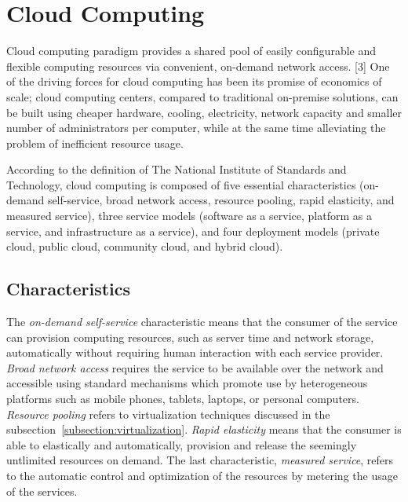 \section{Cloud Computing}

Cloud computing paradigm provides a shared pool of easily configurable and flexible computing resources via convenient, on-demand network access. [3] One of the driving forces for cloud computing has been its promise of economics of scale; cloud computing centers, compared to traditional on-premise solutions, can be built using cheaper hardware, cooling, electricity, network capacity and smaller number of administrators per computer, while at the same time alleviating the problem of inefficient resource usage.~\cite{Mell:2011:ccdef}

According to the definition of The National Institute of Standards and Technology, cloud computing is composed of five essential characteristics (on-demand self-service, broad network access, resource pooling, rapid elasticity, and measured service), three service models (software as a service, platform as a service, and infrastructure as a service), and four deployment models (private cloud, public cloud, community cloud, and hybrid cloud).~\cite{Mell:2011:ccdef}

\subsection{Characteristics}
The \emph{on-demand self-service} characteristic means that the consumer of the service can provision computing resources, such as server time and network storage, automatically without requiring human interaction with each service provider. \emph{Broad network access} requires the service to be available over the network and accessible using standard mechanisms which promote use by heterogeneous platforms such as mobile phones, tablets, laptops, or personal computers. \emph{Resource pooling} refers to virtualization techniques discussed in the subsection~\ref{subsection:virtualization}. \emph{Rapid elasticity} means that the consumer is able to elastically and automatically, provision and release the seemingly untlimited resources on demand. The last characteristic, \emph{measured service}, refers to the automatic control and optimization of the resources by metering the usage of the services.~\cite{Mell:2011:ccdef}

